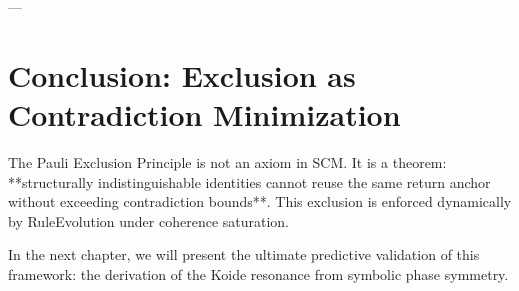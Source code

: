 ---

\section{Conclusion: Exclusion as Contradiction Minimization}

The Pauli Exclusion Principle is not an axiom in SCM. It is a theorem: **structurally indistinguishable identities cannot reuse the same return anchor without exceeding contradiction bounds**. This exclusion is enforced dynamically by RuleEvolution under coherence saturation.

In the next chapter, we will present the ultimate predictive validation of this framework: the derivation of the Koide resonance from symbolic phase symmetry.

